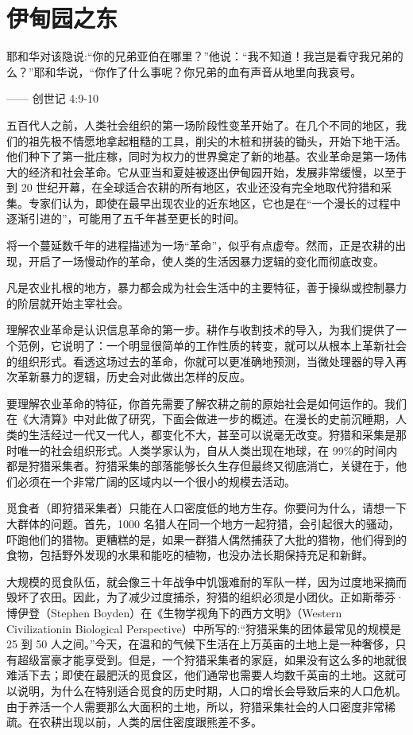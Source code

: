\chapter[伊甸园之东]{伊甸园之东}

\begin{tcolorbox}
耶和华对该隐说:“你的兄弟亚伯在哪里？”他说：“我不知道！我岂是看守我兄弟的么？”耶和华说，“你作了什么事呢？你兄弟的血有声音从地里向我哀号。
\begin{flushright}
—— 创世记 4:9-10 
\end{flushright}
\end{tcolorbox}

五百代人之前，人类社会组织的第一场阶段性变革开始了。在几个不同的地区，我们的祖先极不情愿地拿起粗糙的工具，削尖的木桩和拼装的锄头，开始下地干活。他们种下了第一批庄稼，同时为权力的世界奠定了新的地基。农业革命是第一场伟大的经济和社会革命。它从亚当和夏娃被逐出伊甸园开始，发展非常缓慢，以至于到 20 世纪开幕，在全球适合农耕的所有地区，农业还没有完全地取代狩猎和采集。专家们认为，即使在最早出现农业的近东地区，它也是在“一个漫长的过程中逐渐引进的”，可能用了五千年甚至更长的时间。

将一个蔓延数千年的进程描述为一场“革命”，似乎有点虚夸。然而，正是农耕的出现，开启了一场慢动作的革命，使人类的生活因暴力逻辑的变化而彻底改变。

凡是农业扎根的地方，暴力都会成为社会生活中的主要特征，善于操纵或控制暴力的阶层就开始主宰社会。

理解农业革命是认识信息革命的第一步。耕作与收割技术的导入，为我们提供了一个范例，它说明了：一个明显很简单的工作性质的转变，就可以从根本上革新社会的组织形式。看透这场过去的革命，你就可以更准确地预测，当微处理器的导入再次革新暴力的逻辑，历史会对此做出怎样的反应。

要理解农业革命的特征，你首先需要了解农耕之前的原始社会是如何运作的。我们在《大清算》中对此做了研究，下面会做进一步的概述。在漫长的史前沉睡期，人类的生活经过一代又一代人，都变化不大，甚至可以说毫无改变。狩猎和采集是那时唯一的社会组织形式。人类学家认为，自从人类出现在地球，在 99\%的时间内都是狩猎采集者。狩猎采集的部落能够长久生存但最终又彻底消亡，关键在于，他们必须在一个非常广阔的区域内以一个很小的规模去活动。

觅食者（即狩猎采集者）只能在人口密度低的地方生存。你要问为什么，请想一下大群体的问题。首先，1000 名猎人在同一个地方一起狩猎，会引起很大的骚动，吓跑他们的猎物。更糟糕的是，如果一群猎人偶然捕获了大批的猎物，他们得到的食物，包括野外发现的水果和能吃的植物，也没办法长期保持充足和新鲜。

大规模的觅食队伍，就会像三十年战争中饥饿难耐的军队一样，因为过度地采摘而毁坏了农田。因此，为了减少过度捕杀，狩猎的组织必须是小团伙。正如斯蒂芬·博伊登（Stephen Boyden）在《生物学视角下的西方文明》（Western Civilizationin Biological Perspective）中所写的:“狩猎采集的团体最常见的规模是 25 到 50 人之间。”今天，在温和的气候下生活在上万英亩的土地上是一种奢侈，只有超级富豪才能享受到。但是，一个狩猎采集者的家庭，如果没有这么多的地就很难活下去；即使在最肥沃的觅食区，他们通常也需要人均数千英亩的土地。这就可以说明，为什么在特别适合觅食的历史时期，人口的增长会导致后来的人口危机。由于养活一个人需要那么大面积的土地，所以，狩猎采集社会的人口密度非常稀疏。在农耕出现以前，人类的居住密度跟熊差不多。

